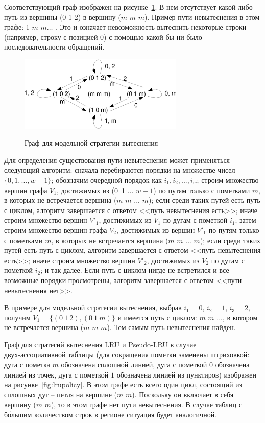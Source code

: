 \documentclass[14pt]{extreport}
\newcommand{\LRU}{\textsf{LRU}\xspace}
\newcommand{\PseudoLRU}{\textsf{Pseudo-LRU}\xspace}
\begin{document}
Соответствующий граф изображен на рисунке~\ref{badpolicy}. В нем
отсутствует какой-либо путь из вершины (0 1 2) в вершину ($m$ $m$
$m$). Пример пути невытеснения в этом графе: 1 $m$ $m \dots$ . Это и
означает невозможность вытеснить некоторые строки (например, строку с позицией
0) с помощью какой бы ни было последовательности обращений.
\begin{figure}[t]\center
  \includegraphics[width=0.7\textwidth]{2.theor/badpolicy}\\
  \caption{Граф для модельной стратегии вытеснения}\label{badpolicy}
\end{figure}

Для определения существования пути невытеснения может применяться
следующий алгоритм: сначала перебираются порядки на множестве чисел
$\{0, 1, ..., w{-}1\}$; обозначим очередной порядок как $i_1, i_2,
..., i_w$; строим множество вершин графа $V_1$, достижимых из (0~1
... $w{-}1$) по путям только с пометками $m$, в которых не встречается вершина
($m$ $m$ ... $m$); если среди таких путей есть путь с циклом,
алгоритм завершается с ответом <<путь невытеснения есть>>; иначе
строим множество вершин $V'_1$, достижимых из $V_1$ по дугам с
пометкой $i_1$; затем строим множество вершин графа $V_2$, достижимых из
вершин $V'_1$ по путям только с пометками $m$, в которых не встречается вершина
($m$ $m$ ... $m$); если среди таких путей есть путь с циклом,
алгоритм завершается с ответом <<путь невытеснения есть>>; иначе
строим множество вершин $V'_2$, достижимых из $V_2$ по дугам с
пометкой $i_2$; и так далее. Если путь с циклом нигде не встретился и все
возможные порядки просмотрены, алгоритм завершается с ответом <<пути
невытеснения нет>>.

В примере для модельной стратегии вытеснения, выбрав $i_1 = 0$, $i_2 = 1$, $i_3
= 2$, получим $V_1 = \{ (0~1~2), (0~1~m) \}$ и имеется путь с циклом: $m$ $m$
..., в котором не встречается вершина ($m$ $m$ $m$). Тем самым путь невытеснения
найден.

Граф для стратегий вытеснения \LRU и \PseudoLRU в случае\\двух-ассоциативной
таблицы (для сокращения пометки заменены
штриховкой: дуга с пометка $m$ обозначена сплошной линией, дуга с
пометкой $0$ обозначена линией из точек, дуга с пометкой $1$
обозначена линией из пунктиров) изображен на
рисунке~\ref{fig:lrupolicy}. В этом графе есть всего один цикл,
состоящий из сплошных дуг -- петля на вершине ($m$ $m$). Поскольку он включает
в себя вершину ($m$ $m$), то в этом графе нет пути невытеснения.
В случае таблиц с б\'{о}льшим количеством строк в регионе ситуация будет
аналогичной.
\end{document}
